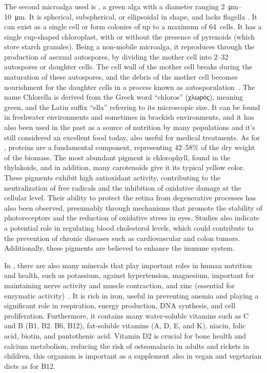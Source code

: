 \subsubsection{}
The second microalga used is , a green alga with a diameter ranging \qtyrange{2}{10}{\micro\metre}. It is spherical, subspherical, or ellipsoidal in shape, and lacks flagella . It can exist as a single cell or form colonies of up to a maximum of \qty{64}{cells}. It has a single cup-shaped chloroplast, with or without the presence of pyrenoids (which store starch granules). Being a non-mobile microalga, it reproduces through the production of asexual autospores, by dividing the mother cell into 2–32\zxriv{} autospores or daughter cells. The cell wall of the mother cell breaks during the maturation of these autospores, and the debris of the mother cell becomes nourishment for the daughter cells in a process known as autosporulation~\parencite{ru_Chlorella_2020}. The name Chlorella is derived from the Greek word “chloros” (χλωρός), meaning green, and the Latin suffix “ella” referring to its microscopic size. It can be found in freshwater environments and sometimes in brackish environments, and it has also been used in the past as a source of nutrition by many populations and it’s still considered an excellent food today, also useful for medical treatments. As for , proteins are a fundamental component, representing \numrange{42}{58}\%\zxriv{} of the dry weight of the biomass. The most abundant pigment is chlorophyll, found in the thylakoids, and in addition, many carotenoids give it its typical yellow color. These pigments exhibit high antioxidant activity, contributing to the neutralization of free radicals and the inhibition of oxidative damage at the cellular level. Their ability to protect the retina from degenerative processes has also been observed, presumably through mechanisms that promote the stability of photoreceptors and the reduction of oxidative stress in eyes. Studies also indicate a potential role in regulating blood cholesterol levels, which could contribute to the prevention of chronic diseases such as cardiovascular and colon tumors. Additionally, these pigments are believed to enhance the immune system.

In , there are also many minerals that play important roles in human nutrition and health, such as potassium, against hypertension, magnesium, important for maintaining nerve activity and muscle contraction, and zinc (essential for enzymatic activity)~\parencite{safi_Morphology_2014}\zxriv{}. It is rich in iron, useful in preventing anemia and playing a significant role in respiration, energy production, DNA synthesis, and cell proliferation. Furthermore, it contains many water-soluble vitamins such as C and B (B1, B2. B6, B12), fat-soluble vitamins (A, D, E, and K), niacin, folic acid, biotin, and pantothenic acid. Vitamin D2 is crucial for bone health and calcium metabolism, reducing the risk of osteomalacia in adults and rickets in children, this organism is important as a supplement also in vegan and vegetarian diets as for B12.

